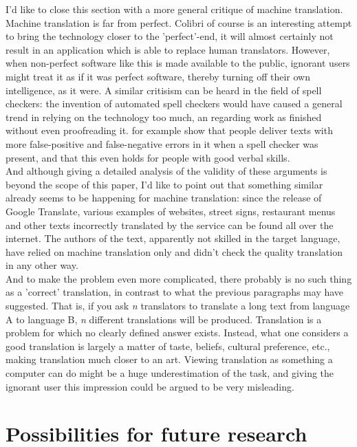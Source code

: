 \documentclass[12pt]{article}
\begin{document}
I'd like to close this section with a more general critique of machine translation. Machine translation is far from perfect. Colibri of course is an interesting attempt to bring the technology closer to the 'perfect'-end, it will almost certainly not result in an application which is able to replace human translators. However, when non-perfect software like this is made available to the public, ignorant users might treat it as if it was perfect software, thereby turning off their own intelligence, as it were. A similar critisism can be heard in the field of spell checkers: the invention of automated  spell checkers would have caused a general trend in relying on the technology too much, an regarding work as finished without even proofreading it. \citet{galletta05} for example show that people deliver texts with more false-positive and false-negative errors in it when a spell checker was present, and that this even holds for people with good verbal skills. \\\indent
And although giving a detailed analysis of the validity of these arguments is beyond the scope of this paper, I'd like to point out that something similar already seems to be happening for machine translation: since the release of Google Translate, various examples of websites, street signs, restaurant menus and other texts incorrectly translated by the service can be found all over the internet. The authors of the text, apparently not skilled in the target language, have relied on machine translation only and didn't check the quality translation in any other way.\\\indent
And to make the problem even more complicated, there probably is no such thing as a 'correct' translation, in contrast to what the previous paragraphs may have suggested. That is, if you ask \emph{n} translators to translate a long text from language A to language B, \emph{n} different translations will be produced. Translation is a problem for which no clearly defined answer exists. Instead, what one considers a good translation is largely a matter of taste, beliefs, cultural preference, etc., making translation much closer to an art. Viewing translation as something a computer can do might be a huge underestimation of the task, and giving the ignorant user this impression could be argued to be very misleading.







\section{Possibilities for future research}
\end{document}

